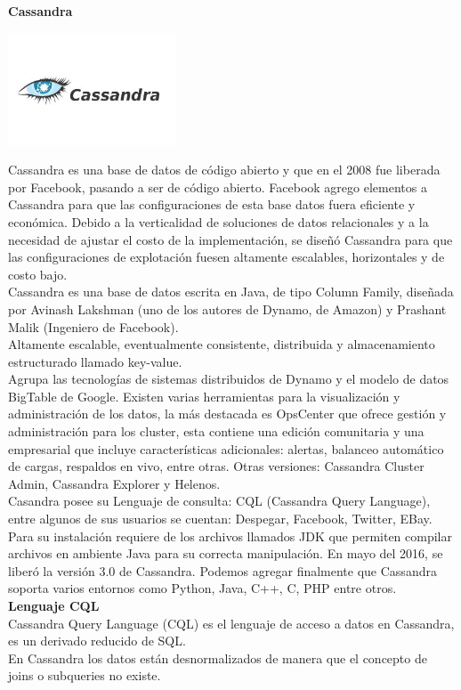 \documentclass[twoside,twocolumn]{article}
\begin{document}
\textbf{Cassandra}\\
\begin{center}
	\includegraphics[width=5cm]{./img/3.png} 
\end{center}
Cassandra es una base de datos de código abierto y que en el 2008 fue liberada por Facebook, pasando a ser de código abierto. Facebook agrego elementos a Cassandra para que las configuraciones de esta base datos fuera eficiente y económica.
Debido a la verticalidad de soluciones de datos relacionales y a la necesidad de ajustar el costo de la implementación, se diseñó Cassandra para que las configuraciones de explotación fuesen altamente escalables, horizontales y de costo bajo. 
\\
Cassandra es una base de datos escrita en Java, de tipo Column Family, diseñada por Avinash Lakshman (uno de los autores de Dynamo, de Amazon) y Prashant Malik (Ingeniero de Facebook). 
\\
Altamente escalable, eventualmente consistente, distribuida y almacenamiento estructurado llamado key-value. 
\\
Agrupa las tecnologías de sistemas distribuidos de Dynamo y el modelo de datos BigTable de Google. 
Existen varias herramientas para la visualización y administración de los datos, la más destacada es OpsCenter que ofrece gestión y administración para los cluster, esta contiene una edición comunitaria y una empresarial que incluye características adicionales: alertas, balanceo automático de cargas, respaldos en vivo, entre otras. Otras versiones: Cassandra Cluster Admin, Cassandra Explorer y Helenos.
\\
Casandra posee su Lenguaje de consulta: CQL (Cassandra Query Language), entre algunos de sus usuarios se cuentan:   Despegar, Facebook, Twitter, EBay.
Para su instalación requiere de los archivos llamados JDK que permiten compilar archivos en ambiente Java para su correcta manipulación.
En mayo del 2016, se liberó la versión 3.0 de Cassandra.
Podemos agregar finalmente que Cassandra soporta varios entornos como Python, Java, C++, C, PHP entre otros.
\\

\textbf{Lenguaje CQL}\\
Cassandra Query Language (CQL) es el lenguaje de acceso a datos en Cassandra, es un derivado reducido de SQL. \\
En Cassandra los datos están desnormalizados de manera que el concepto de joins o subqueries no existe.\\
\end{document}
